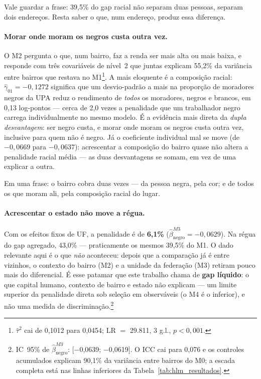 \documentclass[12pt, a4paper, oneside]{article}
\begin{document}
\noindent Vale guardar a frase: 39{,}5\% do gap racial não separam duas pessoas,
separam dois endereços. Resta saber o que, num endereço, produz essa diferença.

\paragraph{Morar onde moram os negros custa outra vez.}
O M2 pergunta o que, num bairro, faz a renda ser mais alta ou mais baixa, e responde com
três covariáveis de nível~2 que juntas explicam 55,2\% da variância
entre bairros que restava no M1\footnote{$\hat\tau^2$ cai de 0,1012 para
0,0454; LR $=$ 29.811, 3 g.l., $p<0{,}001$.}. A mais eloquente é a
composição racial: $\hat\gamma_{01} = −0,1272$ significa que um desvio-padrão a mais
na proporção de moradores negros da UPA reduz o rendimento de \emph{todos} os moradores,
negros e brancos, em 0,13 log-pontos --- cerca de 2{,}0 vezes a
penalidade que um trabalhador negro carrega individualmente no mesmo modelo. É a evidência
mais direta da \emph{dupla desvantagem}: ser negro custa, e morar onde moram os negros
custa outra vez, inclusive para quem não é negro. Já o coeficiente individual mal se move
(de $−0,0669$ para $−0,0637$): acrescentar a composição do bairro quase não altera a
penalidade racial média --- as duas desvantagens se somam, em vez de uma explicar a outra.

\noindent Em uma frase: o bairro cobra duas vezes --- da pessoa negra, pela cor; e de todos
os que moram ali, pela composição racial do lugar.

\paragraph{Acrescentar o estado não move a régua.}
Com os efeitos fixos de UF, a penalidade é de \textbf{6,1\%}
($\hat\beta_{\text{negro}}^{M3} = −0,0629$). Na régua do gap
agregado, 43,0\% --- praticamente os mesmos 39,5\% do M1. O
dado relevante aqui é o que \emph{não} aconteceu: depois que a comparação já é entre
vizinhos, o contexto do bairro (M2) e a unidade da federação (M3) retiram pouco
mais do diferencial. É esse patamar que este trabalho chama de \textbf{gap líquido}: o
que capital humano, contexto de bairro e estado não explicam --- um limite superior da
penalidade direta sob seleção em observáveis (o M4 é o inferior), e não uma medida de
discriminação.\footnote{IC~95\% de $\hat\beta_{\text{negro}}^{M3}$: [−0,0639; −0,0619]. O ICC cai para 0,076 e os controles acumulados explicam
90,1\% da variância entre bairros do M0; a escada completa está nas linhas
inferiores da Tabela~\ref{tab:hlm_resultados}.}
\end{document}
